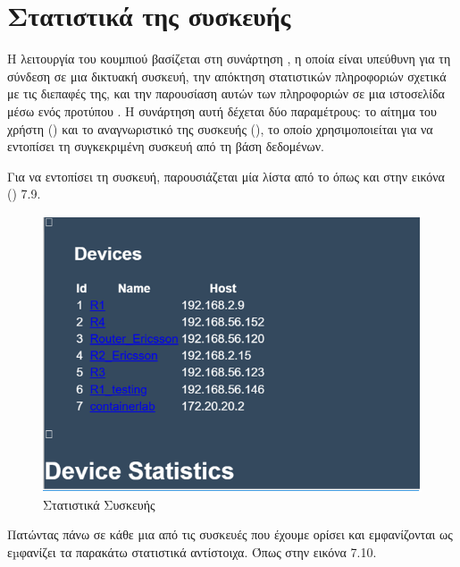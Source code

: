 \section{Στατιστικά της συσκευής}

Η λειτουργία του κουμπιού  βασίζεται στη συνάρτηση , 
η οποία είναι υπεύθυνη για τη σύνδεση σε μια δικτυακή συσκευή, 
την απόκτηση στατιστικών πληροφοριών σχετικά με τις 
διεπαφές της, και την παρουσίαση αυτών των πληροφοριών 
σε μια ιστοσελίδα μέσω ενός προτύπου . Η συνάρτηση αυτή 
δέχεται δύο παραμέτρους: το αίτημα του χρήστη () 
και το αναγνωριστικό της συσκευής (), 
το οποίο χρησιμοποιείται για να εντοπίσει τη συγκεκριμένη 
συσκευή από τη βάση δεδομένων.

Για να εντοπίσει τη συσκευή, παρουσιάζεται μία λίστα από το 
 όπως και στην εικόνα () 7.9.


\FloatBarrier

\begin{figure}[h]
	\centering
	\includegraphics[width=1.0\textwidth]{graphics/device_statistics.png}
	\caption{Στατιστικά Συσκευής}
\end{figure}

\FloatBarrier

Πατώντας πάνω σε κάθε μια από τις συσκευές που έχουμε ορίσει και εμφανίζονται ως  εµφανίζει τα παρακάτω στατιστικά αντίστοιχα. Όπως στην  εικόνα 7.10.


\FloatBarrier

